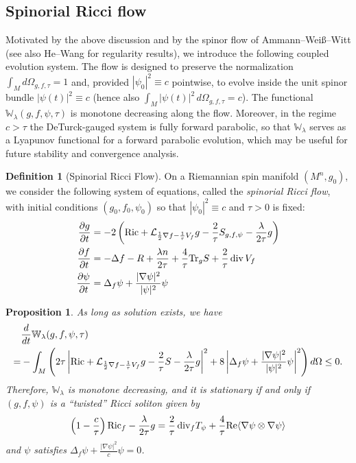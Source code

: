 \documentclass{amsart}
\newtheorem{proposition}[theorem]{Proposition}
\theoremstyle{definition}
\newtheorem{definition}[theorem]{Definition}
\theoremstyle{remark}
\numberwithin{equation}{section}
\newcommand{\abs}[1]{\left|#1\right|}
\newcommand{\Ric}{\textup{Ric}}
\newcommand{\Tr}{\textup{Tr}}
\renewcommand{\div}{\,\textup{div}}
\newcommand{\D}[2]{\frac{\partial #1}{\partial #2}}
\begin{document}
\subsection{Spinorial Ricci flow}
Motivated by the above discussion and by the spinor flow of 
Ammann--Wei\ss--Witt \cite{AWW} (see also He--Wang \cite{HW} for regularity results), we introduce 
the following coupled evolution system. The flow is designed to preserve the normalization 
$\int_M d\Omega_{g,f,\tau}=1$ and, provided $|\psi_0|^2\equiv c$ pointwise, to evolve inside the unit 
spinor bundle $|\psi(t)|^2\equiv c$ (hence also $\int_M|\psi(t)|^2\,d\Omega_{g,f,\tau}=c$). 
The functional $\mathbb{W}_\lambda(g,f,\psi,\tau)$ is monotone decreasing along the flow. Moreover, in the regime $c>\tau$ the DeTurck-gauged system is fully forward parabolic, so that
$\mathbb{W}_\lambda$ serves as a Lyapunov functional for a forward parabolic evolution, which may be useful
for future stability and convergence analysis.

\newpage

\begin{definition}[Spinorial Ricci Flow]
On a Riemannian spin manifold $(M^n,g_0)$, we consider the following system of equations, called the \emph{spinorial Ricci flow}, with initial conditions $(g_0,f_0,\psi_0)$ so that $\abs{\psi_0}^2  \equiv c$ and $\tau > 0$ is fixed:
\begin{align}
\label{eq:coupled_dg}\D{g}{t} & = -2\left(\Ric  + \mathcal{L}_{\frac{1}{2}\nabla f  - \frac{1}{\tau}V_f}g - \frac{2}{\tau}S_{g,f,\psi} - \frac{\lambda}{2\tau}g\right)\\
\label{eq:coupled_df}\D{f}{t} & =  - \Delta f - R + \frac{\lambda n}{2\tau} +\frac{4}{\tau} \Tr_g S + \frac{2}{\tau}\div\,V_f \\
\label{eq:coupled_dpsi}\D{\psi}{t} & =  \Delta_f \psi +  \frac{|\nabla\psi|^2}{|\psi|^2}\psi  
\end{align}
\end{definition}


\begin{proposition}
\label{lma:monotonicity_A}
As long as solution exists, we have
\begin{align}
	\label{eq:monotonicity_A}
& \frac{d}{dt}\mathbb{W}_\lambda(g,f,\psi,\tau)\\
= &  -\int_M \left(2\tau \abs{\Ric + \mathcal{L}_{\frac{1}{2}\nabla f  - \frac{1}{\tau}V_f}g - \frac{2}{\tau}S   - \frac{\lambda}{2\tau}g}^2 + 8 \abs{ \Delta_f\psi + \frac{|\nabla\psi|^2}{|\psi|^2}\psi}^2\right)d\Omega \leq 0. \nonumber
\end{align}
Therefore, $\mathbb{W}_\lambda$ is monotone decreasing, and it is stationary if and only if $(g,f,\psi)$ is a ``twisted'' Ricci soliton given by
\[ \left(1-\frac{c}{\tau}\right)\Ric_f - \frac{\lambda}{2\tau}g= \frac{2}{\tau}\div_f T_\psi + \frac{4}{\tau} \textup{Re}\langle\nabla\psi\otimes\nabla\psi\rangle\]
and $\psi$ satisfies $\Delta_f \psi + \frac{\abs{\nabla\psi}^2}{c}\psi = 0$.

\end{proposition}
\end{document}
